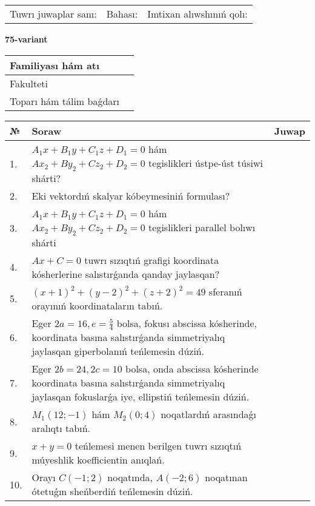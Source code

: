 \documentclass{article}
\begin{document}
\vspace{1cm}

\begin{tabular}{lll}
Tuwrı juwaplar sanı: \underline{\hspace{1.5cm}} & 
Bahası: \underline{\hspace{1.5cm}} & 
Imtixan alıwshınıń qolı: \underline{\hspace{2cm}} \\
\end{tabular}

\egroup

\newpage


\textbf{75-variant}\\

\bgroup
\def\arraystretch{1.6} %

\begin{tabular}{|m{5.7cm}|m{9.5cm}|}
\hline
Familiyası hám atı & \\
\hline
Fakulteti  & \\
\hline
Toparı hám tálim baǵdarı  & \\
\hline
\end{tabular}

\vspace{1cm}

\begin{tabular}{|m{0.7cm}|m{10cm}|m{4cm}|}
\hline
№ & Soraw & Juwap \\
\hline
1. & $A_1x+B_1y+C_1z+D_1=0$ hám $Ax_2+By_2+Cz_2+D_2=0$ tegislikleri ústpe-úst túsiwi shárti? &  \\
\hline
2. & Eki vektordıń skalyar kóbeymesiniń formulası? &  \\
\hline
3. & $A_1x+B_1y+C_1z+D_1=0$ hám $Ax_2+By_2+Cz_2+D_2=0$ tegislikleri parallel bolıwı shárti &  \\
\hline
4. & $Ax+C=0$ tuwrı sızıqtıń grafigi koordinata kósherlerine salıstırǵanda qanday jaylasqan? &  \\
\hline
5. & $(x+1)^{2}+(y-2) ^{2}+(z+2) ^{2}=49$ sferanıń orayınıń koordinataların tabıń. &  \\
\hline
6. & Eger $2a=16, e=\frac{5}{4}$ bolsa, fokusı abscissa kósherinde, koordinata basına salıstırǵanda simmetriyalıq jaylasqan giperbolanıń teńlemesin dúziń. &  \\
\hline
7. & Eger $2b=24, 2 c=10$ bolsa, onda abscissa kósherinde koordinata basına salıstırǵanda simmetriyalıq jaylasqan fokuslarǵa iye, ellipstiń teńlemesin dúziń. &  \\
\hline
8. & $M_{1} (12;-1)$ hám $M_{2} (0;4)$ noqatlardıń arasındaǵı aralıqtı tabıń. &  \\
\hline
9. & $x+y=0$ teńlemesi menen berilgen tuwrı sızıqtıń múyeshlik koefficientin anıqlań. &  \\
\hline
10. & Orayı $C (-1;2)$ noqatında, $A (-2;6 )$ noqatınan ótetuǵın sheńberdiń teńlemesin dúziń. &  \\
\hline
\end{tabular}
\end{document}
